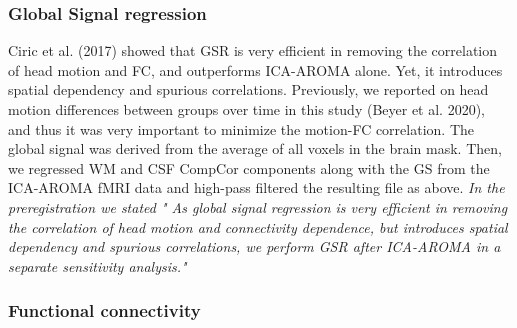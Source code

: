 \documentclass[
]{article}
\begin{document}
\hypertarget{global-signal-regression}{%
\subsubsection{Global Signal regression}\label{global-signal-regression}}

Ciric et al. (2017) showed that GSR is very efficient in removing the correlation of head motion and FC, and outperforms ICA-AROMA alone. Yet, it introduces spatial dependency and spurious correlations. Previously, we reported on head motion differences between groups over time in this study (Beyer et al. 2020), and thus it was very important to minimize the motion-FC correlation. The global signal was derived from the average of all voxels in the brain mask. Then, we regressed WM and CSF CompCor components along with the GS from the ICA-AROMA fMRI data and high-pass filtered the resulting file as above.
\emph{In the preregistration we stated " As global signal regression is very efficient in removing the correlation of head motion and connectivity dependence, but introduces spatial dependency and spurious correlations, we perform GSR after ICA-AROMA in a separate sensitivity analysis."}

\hypertarget{functional-connectivity}{%
\subsubsection{Functional connectivity}\label{functional-connectivity}}
\end{document}
